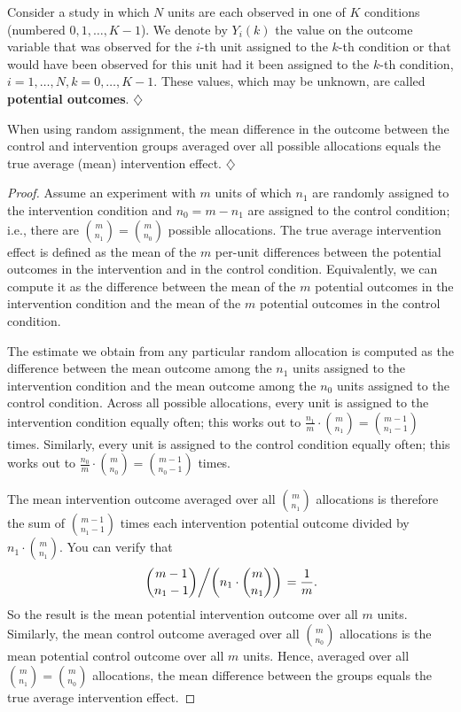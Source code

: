 \documentclass[a4paper]{tufte-book}\usepackage[]{graphicx}\usepackage[]{xcolor}
\newcommand{\term}[1]{\textbf{#1}}
\newcommand*{\parend}[1][$\diamondsuit$]{%
  \unskip\nobreak\hspace{1em plus 1fill}$\diamondsuit$%
}
\begin{document}
\label{def:potentialoutcomes}
  Consider a study in which $N$ units are each observed in 
  one of $K$ conditions (numbered $0, 1, \dots, K-1$).
  We denote by $Y_i(k)$ the value on the outcome variable 
  that was observed for the $i$-th unit assigned to the $k$-th condition
  or that would have been observed for this unit had it been
  assigned to the $k$-th condition, $i = 1, \dots, N, k = 0, \dots, K-1$.
  These values, which may be unknown, are called \term{potential outcomes}.
\parend

\label{th:unbiased}
  When using random assignment, 
  the mean difference in the outcome between the control and intervention groups
  averaged over all possible allocations equals the true average (mean) intervention 
  effect.
\parend

\begin{proof}
  Assume an experiment with $m$ units of which $n_1$ are randomly assigned to 
  the intervention
  condition and $n_0 = m - n_1$ are assigned to the control condition;
  i.e., there are $\binom{m}{n_1} = \binom{m}{n_0}$ possible allocations.
  The true average intervention effect is defined as the mean of the
  $m$ per-unit differences between the potential outcomes in the intervention 
  and in the control condition.
  Equivalently, we can compute it as the difference between the mean
  of the $m$ potential outcomes in the intervention condition and the mean
  of the $m$ potential outcomes in the control condition.
  
  The estimate we obtain from any particular random allocation is computed
  as the difference between the mean outcome among the $n_1$ units assigned to
  the intervention condition and the mean outcome among the $n_0$ units assigned
  to the control condition.
  Across all possible allocations, 
  every unit is assigned to the intervention condition equally often;
  this works out to $\frac{n_1}{m} \cdot \binom{m}{n_1} = \binom{m-1}{n_1 - 1}$
  times.
  Similarly, every unit is assigned to the control condition equally often;
  this works out to $\frac{n_0}{m} \cdot \binom{m}{n_0} = \binom{m-1}{n_0 - 1}$
  times.
  
  The mean intervention outcome averaged over all ${m} \choose {n_1}$ allocations
  is therefore the sum of $\binom{m-1}{n_1 - 1}$ times each intervention
  potential outcome divided by $n_1 \cdot \binom{m}{n_1}$.
  You can verify that 
  \[
    \left. \binom{m-1}{n_1 - 1} \middle/  \left(n_1 \cdot \binom{m}{n_1}\right)\right.
    = \frac{1}{m}.
  \]
  So the result is the mean potential intervention outcome over all $m$ units.
  Similarly, the mean control outcome averaged over all $\binom{m}{n_0}$ allocations
  is the mean potential control outcome over all $m$ units.
  Hence, averaged over all $\binom{m}{n_1} = \binom{m}{n_0}$ allocations,
  the mean difference between the groups equals the true average intervention effect.
\end{proof}
\end{document}
